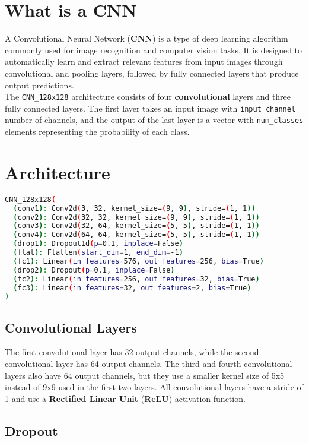 \documentclass{report}
\begin{document}
\section{What is a CNN}
A Convolutional Neural Network (\textbf{CNN}) is a type of deep learning algorithm commonly used for image recognition and computer vision tasks. It is designed to automatically learn and extract relevant features from input images through convolutional and pooling layers, followed by fully connected layers that produce output predictions. \\
The \texttt{CNN\_128x128} architecture consists of four \textbf{convolutional} layers and three fully connected layers. The first layer takes an input image with \texttt{input\_channel} number of channels, and the output of the last layer is a vector with \texttt{num\_classes} elements representing the probability of each class.

\section{Architecture}


\begin{lstlisting}[language=bash]
CNN_128x128(
  (conv1): Conv2d(3, 32, kernel_size=(9, 9), stride=(1, 1))
  (conv2): Conv2d(32, 32, kernel_size=(9, 9), stride=(1, 1))
  (conv3): Conv2d(32, 64, kernel_size=(5, 5), stride=(1, 1))
  (conv4): Conv2d(64, 64, kernel_size=(5, 5), stride=(1, 1))
  (drop1): Dropout1d(p=0.1, inplace=False)
  (flat): Flatten(start_dim=1, end_dim=-1)
  (fc1): Linear(in_features=576, out_features=256, bias=True)
  (drop2): Dropout(p=0.1, inplace=False)
  (fc2): Linear(in_features=256, out_features=32, bias=True)
  (fc3): Linear(in_features=32, out_features=2, bias=True)
)
\end{lstlisting}


\subsection{Convolutional Layers}

The first convolutional layer has 32 output channels, while the second convolutional layer has 64 output channels. The third and fourth convolutional layers also have 64 output channels, but they use a smaller kernel size of 5x5 instead of 9x9 used in the first two layers. All convolutional layers have a stride of 1 and use a \textbf{Rectified Linear Unit} (\textbf{ReLU}) activation function.
\subsection{Dropout}
\end{document}

